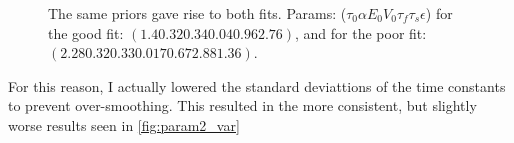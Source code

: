 \begin{figure}
\label{fig:badfit_param1}
\caption{The same priors gave rise to both fits. Params: ($\tau_0 \alpha E_0 V_0 \tau_f \tau_s \epsilon$)
for the good fit: $(1.40 .32 0.34 0.04  0.96 2.76)$, and for the poor fit:
$(2.28 0.32 0.33 0.017 0.67 2.88 1.36)$.}
\end{figure}

For this reason, I actually lowered the standard deviattions of the time
constants to prevent over-smoothing. This resulted in the more consistent, but
slightly worse results seen in \autoref{fig:param2_var}

